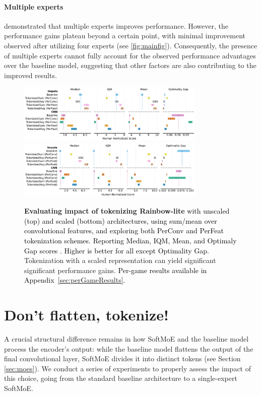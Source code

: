\documentclass{article} %
\newcommand{\rebuttal}[1]{\textcolor{black}{#1}}
\begin{document}
\paragraph{Multiple experts} \citet{ceron2024mixtures} demonstrated that multiple experts improves performance. However, the performance gains plateau beyond a certain point, with minimal improvement observed after utilizing four experts (see \autoref{fig:mainfig}). Consequently, the presence of multiple experts cannot fully account for the observed performance advantages over the baseline model, suggesting that other factors are also contributing to the improved results.


\begin{figure}[!t]
    \centering
    \includegraphics[width=0.8\textwidth]{figures/results/TokenizedRainbowUnscaledRebuttal_IntEstimates.pdf}
    \includegraphics[width=0.8\textwidth]{figures/results/TokenizedRainbowScaledRebuttal_IntEstimates.pdf}
    \caption{\textbf{Evaluating impact of tokenizing Rainbow-lite} \rebuttal{with unscaled (top) and scaled (bottom) architectures, using sum/mean over convolutional features, and exploring both PerConv and PerFeat tokenization schemes. Reporting Median, IQM, Mean, and Optimaly Gap scores \citep{agarwal2021deep}. Higher is better for all except Optimality Gap.} Tokenization with a scaled representation can yield significant significant performance gains. \rebuttal{Per-game results available in Appendix~\ref{sec:perGameResults}.} 
    }
    \label{fig:nonmoeexper}
\end{figure}

\section{Don't flatten, tokenize!}
\label{sec:don'tflatten}
A crucial structural difference remains in how SoftMoE and the baseline model process the encoder's output: while the baseline model flattens the output of the final convolutional layer, SoftMoE divides it into distinct tokens (see Section \ref{sec:moes}). We conduct a series of experiments to properly assess the impact of this choice, going from the standard baseline architecture to a single-expert SoftMoE.
\end{document}
